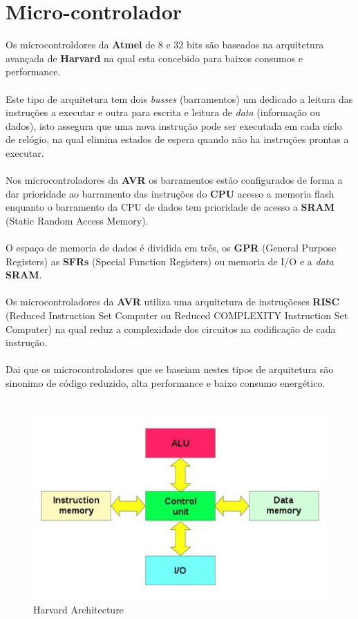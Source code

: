 \section{Micro-controlador}
Os microcontroldores da \textbf{Atmel} de 8 e 32 bits são baseados na arquitetura avançada de \textbf{Harvard} na qual esta concebido para baixos consumos e performance.
\\
\\
Este tipo de arquitetura tem dois  \textit{busses} (barramentos) um dedicado a leitura das instruções a executar e outra para escrita e leitura de \textit{data} (informação ou dados), isto assegura que uma nova instrução pode ser executada em cada ciclo de relógio, na qual elimina estados de espera quando não ha instruções prontas a executar.
\\
\\
Nos microcontroladores da \textbf{AVR} os barramentos estão configurados de forma a dar prioridade ao barramento das instruções do \textbf{CPU} acesso a memoria flash enquanto o barramento da CPU de dados tem prioridade de acesso a \textbf{SRAM} (Static Random Access Memory).
\\
\\
O espaço de memoria de dados é dividida em três, os \textbf{GPR} (General Purpose Registers) as \textbf{SFRs} (Special Function Registers) ou memoria de I/O e a \textit{data} \textbf{SRAM}.
\\
\\
Os microcontroladores da \textbf{AVR} utiliza uma arquitetura de instruçõeses \textbf{RISC} (Reduced Instruction Set Computer ou Reduced COMPLEXITY Instruction Set Computer) na qual reduz a complexidade dos circuitos na codificação de cada instrução.
\\
\\
Dai que os microcontroladores que se baseiam nestes tipos de arquitetura são sinonimo de código reduzido, alta performance e baixo consumo energético.
\\
\\
\begin{figure}[H]
	\centering
	\includegraphics[scale=1]{./image/PESTA/Diagrama/Harvard_architecture.jpg}
	\caption{Harvard Architecture}
	\label{Harvard_architecture}
\end{figure}

